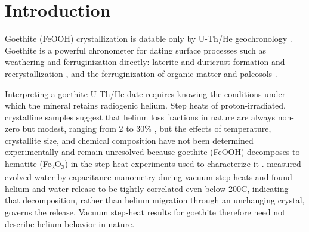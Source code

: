 
\providecommand{\tophline}{\toprule}
\providecommand{\middlehline}{\midrule}
\providecommand{\bottomhline}{\bottomrule}

\section{Introduction}\label{sec:introduction}

Goethite (FeOOH) crystallization is datable only by U-Th/He geochronology \citep{shustervasconcelos2005,farley2024}. Goethite is a powerful chronometer for dating surface processes such as weathering and ferruginization directly: laterite and duricrust formation and recrystallization \citep{monteiro2014,allard2018,ansart2022}, and the ferruginization of organic matter and paleosols \citep{heim2006,yappshuster2011,vasconcelos2013,danisik2013,hofmann2017}. 

Interpreting a goethite U-Th/He date requires knowing the conditions under which the mineral retains radiogenic helium. Step heats of proton-irradiated, crystalline samples suggest that helium loss fractions in nature are always non-zero but modest, ranging from 2 to 30\% \citep{shustervasconcelos2005,heim2006,hofmann2017,deng2017}, but the effects of temperature, crystallite size, and chemical composition have not been determined experimentally and remain unresolved because goethite (FeOOH) decomposes to hematite (Fe\textsubscript{2}O\textsubscript{3}) in the step heat experiments used to characterize it \citep{farley2024}. \citet{farley2024} measured evolved water by capacitance manometry during vacuum step heats and found helium and water release to be tightly correlated even below 200\textdegree C, indicating that decomposition, rather than helium migration through an unchanging crystal, governs the release. Vacuum step-heat results for goethite therefore need not describe helium behavior in nature.

